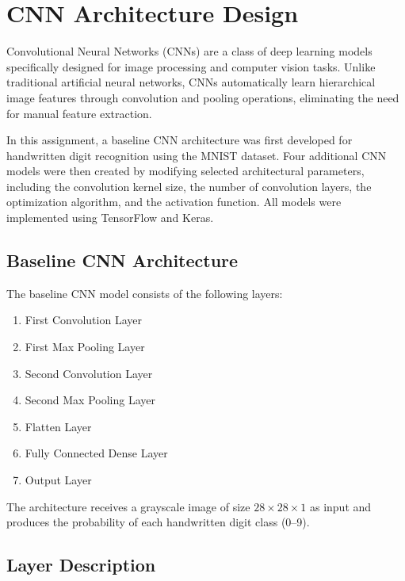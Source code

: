 
\section{CNN Architecture Design}

Convolutional Neural Networks (CNNs) are a class of deep learning models specifically designed for image processing and computer vision tasks. Unlike traditional artificial neural networks, CNNs automatically learn hierarchical image features through convolution and pooling operations, eliminating the need for manual feature extraction\cite{goodfellow2016deep,lecun1998gradient}.

In this assignment, a baseline CNN architecture was first developed for handwritten digit recognition using the MNIST dataset. Four additional CNN models were then created by modifying selected architectural parameters, including the convolution kernel size, the number of convolution layers, the optimization algorithm, and the activation function. All models were implemented using TensorFlow and Keras.

\subsection{Baseline CNN Architecture}

The baseline CNN model consists of the following layers:

\begin{enumerate}
    \item First Convolution Layer
    \item First Max Pooling Layer
    \item Second Convolution Layer
    \item Second Max Pooling Layer
    \item Flatten Layer
    \item Fully Connected Dense Layer
    \item Output Layer
\end{enumerate}

The architecture receives a grayscale image of size $28 \times 28 \times 1$ as input and produces the probability of each handwritten digit class (0--9).

\subsection{Layer Description}

